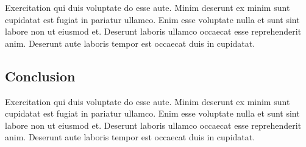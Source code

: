 Exercitation qui duis voluptate do esse aute. Minim deserunt ex minim sunt cupidatat est fugiat in pariatur ullamco. Enim esse voluptate nulla et sunt sint labore non ut eiusmod et. Deserunt laboris ullamco occaecat esse reprehenderit anim. Deserunt aute laboris tempor est occaecat duis in cupidatat.

\subsection{Conclusion} \label{subsec:conclusionNeo4j}

Exercitation qui duis voluptate do esse aute. Minim deserunt ex minim sunt cupidatat est fugiat in pariatur ullamco. Enim esse voluptate nulla et sunt sint labore non ut eiusmod et. Deserunt laboris ullamco occaecat esse reprehenderit anim. Deserunt aute laboris tempor est occaecat duis in cupidatat.
